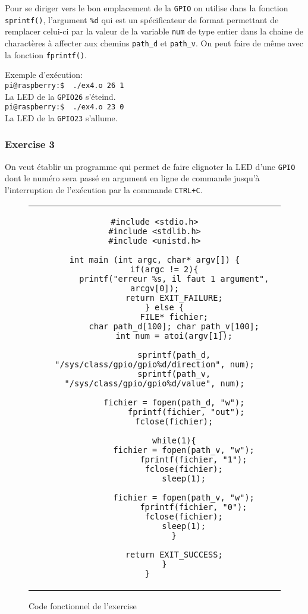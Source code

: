 \documentclass[11pt, openright]{book}
\begin{document}
Pour se diriger vers le bon emplacement de la \texttt{GPIO} on utilise dans la fonction \texttt{sprintf()}, l'argument \texttt{\%d} qui est un spécificateur de format permettant de remplacer celui-ci par la valeur de la variable \texttt{num} de type entier dans la chaine de charactères à affecter aux chemins \texttt{path\_d} et \texttt{path\_v}. On peut faire de même avec la fonction \texttt{fprintf()}.

Exemple d'exécution:\\
\texttt{pi@raspberry:\text{$\sim$}\$ \ ./ex4.o 26 1}\\
La LED de la \texttt{GPIO26} s'éteind.\\
\texttt{pi@raspberry:\text{$\sim$}\$ \ ./ex4.o 23 0}\\
La LED de la \texttt{GPIO23} s'allume.

\subsubsection{Exercise 3}

On veut établir un programme qui permet de faire clignoter la LED d'une \texttt{GPIO} dont le numéro sera passé en argument en ligne de commande jusqu'à l'interruption de l'exécution par la commande \texttt{CTRL+C}.

\begin{figure}[ht!]
	\centering
	\begin{tabular}{c}
		\begin{lstlisting}
#include <stdio.h>
#include <stdlib.h>
#include <unistd.h>

int main (int argc, char* argv[]) {
    if(argc != 2){
        printf("erreur %s, il faut 1 argument", arcgv[0]);
        return EXIT_FAILURE;
    } else {
        FILE* fichier;
        char path_d[100]; char path_v[100];
        int num = atoi(argv[1]);

        sprintf(path_d, "/sys/class/gpio/gpio%d/direction", num);
        sprintf(path_v, "/sys/class/gpio/gpio%d/value", num);

        fichier = fopen(path_d, "w");
             fprintf(fichier, "out");
        fclose(fichier);

        while(1){
            fichier = fopen(path_v, "w");
                fprintf(fichier, "1");
            fclose(fichier);
			sleep(1);

            fichier = fopen(path_v, "w");
                fprintf(fichier, "0");
            fclose(fichier);
			sleep(1);
        }

        return EXIT_SUCCESS;
    }
}	
				\end{lstlisting}
	\end{tabular}
	\caption{Code fonctionnel de l'exercise }
\end{figure}
\end{document}
